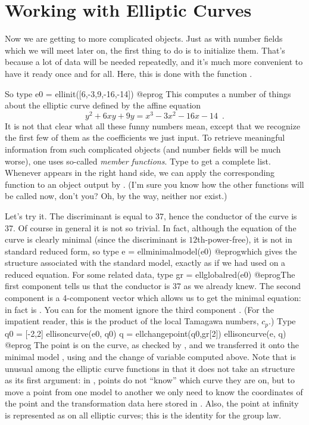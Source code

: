 \section{Working with Elliptic Curves}

Now we are getting to more complicated objects. Just as with number fields
which we will meet later on, the first thing to do is to initialize them.
That's because a lot of data will be needed repeatedly, and it's much more
convenient to have it ready once and for all. Here, this is done with the
function .

So type
\bprog
  e0 = ellinit([6,-3,9,-16,-14])
@eprog
This computes a number of things
about the elliptic curve defined by the affine equation
%
$$ y^2+6xy+9y = x^3-3x^2-16x-14\enspace. $$
%
It is not that clear what all these funny numbers mean, except that we
recognize the first few of them as the coefficients we just input. To
retrieve meaningful information from such complicated objects (and number
fields will be much worse), one uses so-called \emph{member
functions}. Type  to get a complete list. Whenever  appears
in the right hand side, we can apply the corresponding function to an object
output by . (I'm sure you know how the other  functions
will be called now, don't you? Oh, by the way, neither  nor
 exist.)

  Let's try it. The discriminant  is equal to 37, hence
the conductor of the curve is 37. Of course in general it is not so
trivial. In fact, although the equation of the curve is clearly
minimal (since the discriminant is $12$th-power-free), it is not in
standard reduced form, so type
\bprog
  e = ellminimalmodel(e0)
@eprog\noindent which
gives the  structure associated with the standard model,
exactly as if we had used  on a reduced equation. For
some related data, type
\bprog
  gr = ellglobalred(e0)
@eprog\noindent The first
component  tells us that the conductor is 37 as we already
knew.  The second component is a 4-component vector which allows us to
get the minimal equation: in fact  is .
You can for the moment ignore the third component . (For the
impatient reader, this is the product of the local Tamagawa numbers, $c_p$.)
Type
\bprog
  q0 = [-2,2]
  ellisoncurve(e0, q0)
  q = ellchangepoint(q0,gr[2])
  ellisoncurve(e, q)
@eprog\noindent
The point  is on the curve, as checked by , and we
transferred it onto the minimal model , using  and
the change of variable computed above. Note that  is
unusual among the elliptic curve functions in that it does not take an
 structure as its first argument: in , points do not
``know'' which curve they are on, but to move a point from one model to
another we only need to know the coordinates of the point and the
transformation data here stored in .  Also, the point at infinity
is represented as \kbd{[0]} on all elliptic curves; this is the identity for
the group law.

